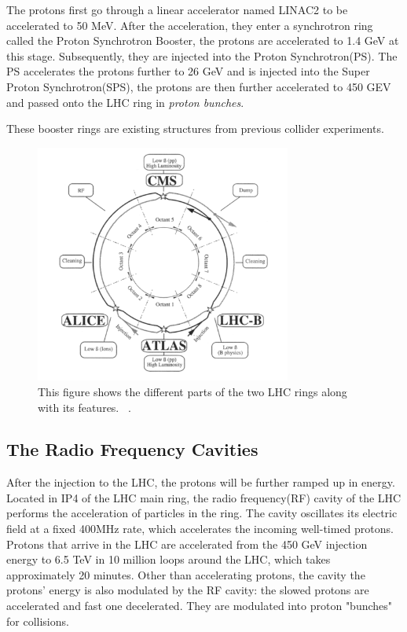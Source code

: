 The protons first go through a linear accelerator named LINAC2 to be accelerated to 50 MeV. After the acceleration, they enter a synchrotron ring called the Proton Synchrotron Booster, the protons are accelerated to 1.4 GeV at this stage. Subsequently, they are injected into the Proton Synchrotron(PS). The PS accelerates the protons further to 26 GeV and is injected into the Super Proton Synchrotron(SPS), the protons are then further accelerated to 450 GEV and passed onto the LHC ring in
\textit{proton bunches}.

These booster rings are existing structures from previous collider experiments.

\begin{figure}[!htb]
    \begin{center}
        \includegraphics[width=0.75\textwidth]{figures/chapter_ATLAS/LHCRing}
        \caption{
			This figure shows the different parts of the two LHC rings along with its features. ~\cite{Pettersson:291782}.
        }
        \label{fig:perterson}
    \end{center}
\end{figure}

\subsection*{The Radio Frequency Cavities}
After the injection to the LHC, the protons will be further ramped up in energy. Located in IP4 of the LHC main ring, the radio frequency(RF) cavity of the LHC performs the acceleration of particles in the ring. The cavity oscillates its electric field at a fixed 400MHz rate, which accelerates the incoming well-timed protons. Protons that arrive in the LHC are accelerated from the 450 GeV injection energy to 6.5 TeV in 10 million loops around the LHC, which takes approximately 20 minutes. Other
than accelerating protons, the cavity the protons' energy is also modulated by the RF cavity: the slowed protons are accelerated and fast one decelerated. They are modulated into proton "bunches" for collisions. 


